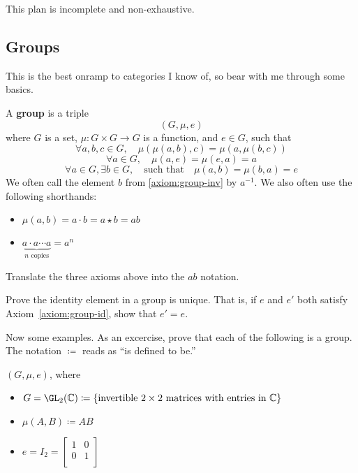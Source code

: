 This plan is incomplete and non-exhaustive.




\subsection*{Groups}
This is the best onramp to categories I know of, so bear with me through some basics.
\begin{definition}
    A {\bf group} is a triple \[ (G,\mu,e)\] where $G$ is a set, 
    $\mu:G\times G\to G$ is a function, and $e\in G$, such that 
    \begin{equation*}\tag{Associativity}
        \forall a,b,c\in G, \quad \mu(\mu(a,b),c) = \mu(a,\mu(b,c))
    \end{equation*}\label{axiom:group-assoc}
    \begin{equation*}\tag{Identity}
        \forall a\in G, \quad \mu(a,e) = \mu(e,a) = a
    \end{equation*}\label{axiom:group-id}
    \begin{equation*}\tag{Inverse}
        \forall a\in G, \exists b\in G, \quad\text{such that}\quad \mu(a,b)=\mu(b,a)=e
    \end{equation*}\label{axiom:group-inv}
    We often call the element $b$ from \ref{axiom:group-inv} by $a^{-1}$.
    We also often use the following shorthands:
    \begin{itemize}
        \item $\mu(a,b) = a\cdot b = a\star b = ab$
        \item $\underbrace{a\cdot a\cdots a}_{\text{$n$ copies}} = a^n$
    \end{itemize}
\end{definition}

\begin{exercise}
    Translate the three axioms above into the $ab$ notation.
\end{exercise}

\begin{exercise}
    Prove the identity element in a group is unique. 
    That is, if $e$ and $e'$ both satisfy Axiom~\ref{axiom:group-id},
    show that $e'=e$.
\end{exercise}

Now some examples. 
As an excercise, prove that each of the following is a group. 
The notation $\coloneq$ reads as ``is defined to be.''

\begin{example}
    $(G,\mu,e)$, where
    \begin{itemize}
        \item $G = \GL_2(\C) \coloneq \{ \text{invertible $2\times 2$ matrices with entries in $\C$}\}$
        \item $\mu(A,B) \coloneq AB$
        \item $e=I_2 = \begin{bmatrix} 1&0\\0&1\\ \end{bmatrix}$
    \end{itemize}
\end{example}

